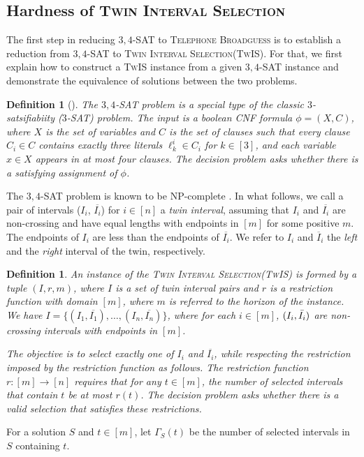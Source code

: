 \documentclass[letterpaper,11pt]{article}
\newtheorem{definition}[theorem]{Definition}
\newcommand{\sattt}{\textsc{$3$-SAT}\xspace}
\newcommand{\sssattt}{\textsc{$3,4$-SAT}\xspace}
\newcommand{\tis}{\textsc{TwIS}\xspace}
\newcommand{\tislong}{\textsc{Twin Interval Selection}\xspace}
\newcommand{\telebg}{\textsc{Telephone Broadguess}\xspace}
\begin{document}
 \subsection{Hardness of \tislong}\label{sec:tishard}
The first step in reducing \sssattt to \telebg is to establish a reduction from \sssattt to \tislong (\tis). For that, we first explain how 
to construct a \tis instance from a given \sssattt instance and demonstrate the equivalence of solutions between the two problems. 

\begin{definition}[\cite{tovey1984simplified}]

The \emph{\sssattt} problem is a special type of the classic $3$-satsifiabiity (\sattt) problem. The input is a boolean CNF formula $\phi=(X, C)$, where $X$ is the set of variables and $C$ is the set of clauses 
such that every clause $C_i \in C$ contains \emph{exactly} three literals $\ell^i_k\in C_i$ for $k\in [3]$, and each variable $x\in X$ appears in at most four clauses. The decision problem asks whether there is a satisfying assignment of $\phi$.
\end{definition}

The \sssattt problem is known to be NP-complete \cite{tovey1984simplified}. 
In what follows, we call a pair of intervals ($I_i$, $\overline{I_i}$) for $i\in [n]$ a \emph{twin interval}, assuming that $I_i$ and $\overline{I_i}$ are non-crossing and have equal lengths with endpoints in $[m]$ for some positive $m$. The endpoints of $I_i$ are less than the endpoints of $\overline{I_i}$. We refer to $I_i$ and $\overline{I}_i$ the \emph{left} and the \emph{right} interval of the twin, respectively.

\begin{definition}

An instance of the \emph{\tislong (\tis)} is formed by a tuple $(I,r,m)$, where $I$ is a set of \emph{twin} interval pairs and $r$ is a \emph{restriction function} with domain $[m]$, where $m$ is referred to the \emph{horizon} of the instance. We have $I = \{(I_1, \overline{I_1}), \ldots, (I_n, \overline{I_n})\}$, where  for each $i\in [m]$, $(I_i, \Bar{I_i})$ are non-crossing intervals with endpoints in $[m]$.

The objective is to select exactly one of $I_i$ and $\overline{I_i}$, while respecting the restriction imposed by the restriction function as follows. The restriction function $r : [m] \to [n]$ requires that for any $t \in [m]$, the number of selected intervals that contain $t$ be at most $r(t)$. The decision problem asks whether there is a valid selection that satisfies these restrictions. 
\end{definition}
For a solution $S$ and $t\in[m]$, let $\Gamma_S(t)$ be the number of selected intervals in $S$ containing $t$.
\end{document}
